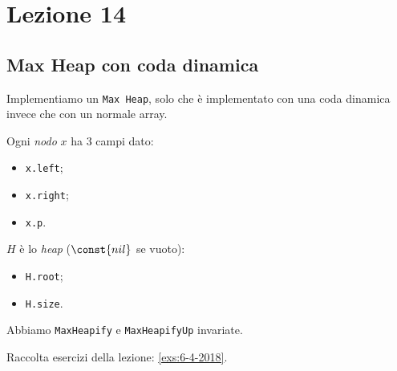 \section{Lezione 14}

\subsection{Max Heap con coda dinamica}
Implementiamo un \texttt{Max Heap}, solo che è implementato con una
coda dinamica invece che con un normale array.

Ogni \emph{nodo} $x$ ha 3 campi dato:
\begin{itemize}[noitemsep]
    \item \texttt{x.left};
    \item \texttt{x.right};
    \item \texttt{x.p}.
\end{itemize}

$H$ è lo \emph{heap} ($\const{nil}$ se vuoto):
\begin{itemize}[noitemsep]
    \item \texttt{H.root};
    \item \texttt{H.size}.
\end{itemize}

Abbiamo \texttt{MaxHeapify} e \texttt{MaxHeapifyUp} invariate.

 

Raccolta esercizi della lezione: \ref{exs:6-4-2018}.